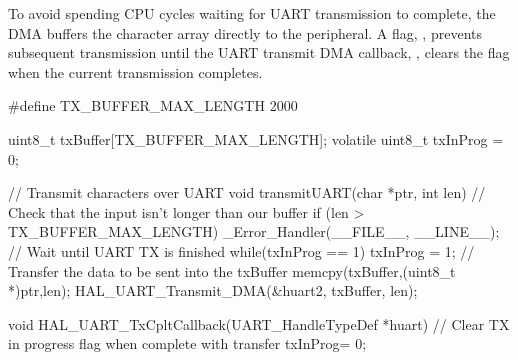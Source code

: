 To avoid spending CPU cycles waiting for UART transmission to complete, the DMA buffers the character array directly to the peripheral. A flag, , prevents subsequent transmission until the UART transmit DMA callback, , clears the flag when the current transmission completes.
\begin{clisting}
#define TX_BUFFER_MAX_LENGTH 2000 

uint8_t txBuffer[TX_BUFFER_MAX_LENGTH];
volatile uint8_t txInProg = 0;

// Transmit characters over UART
void transmitUART(char *ptr, int len)
{  
    // Check that the input isn't longer than our buffer
    if (len > TX_BUFFER_MAX_LENGTH){
        _Error_Handler(__FILE__, __LINE__);
    }
    // Wait until UART TX is finished
    while(txInProg == 1){}
    txInProg = 1;
    // Transfer the data to be sent into the txBuffer
    memcpy(txBuffer,(uint8_t *)ptr,len);
    HAL_UART_Transmit_DMA(&huart2, txBuffer, len); 
}

void HAL_UART_TxCpltCallback(UART_HandleTypeDef *huart)
{
    // Clear TX in progress flag when complete with transfer
    txInProg= 0;
}
\end{clisting}

